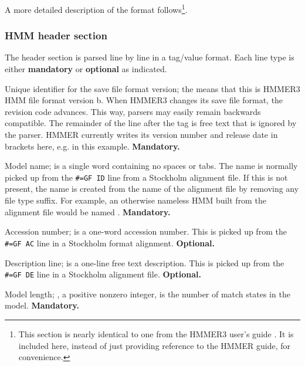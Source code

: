 A more detailed description of the format follows\footnote{This section is
  nearly identical to one from the HMMER3 user's guide
  \cite{hmmer3guide}. It is included here, instead of just providing
  reference to the HMMER guide, for convenience.}.

\subsubsection{HMM header section}

The header section is parsed line by line in a tag/value format. Each
line type is either \textbf{mandatory} or \textbf{optional} as
indicated. 

\begin{sreitems}{}

\item [\emprog{HMMER3/f}] Unique identifier for the save file format
  version; the  means that this is HMMER3 HMM file format
  version b. When HMMER3 changes its save file format, the revision
  code advances. This way, parsers may easily remain backwards
  compatible. The remainder of the line after the  tag
  is free text that is ignored by the parser. HMMER currently writes
  its version number and release date in brackets here,
  e.g. \prog{[3.0b2 | June 2009]} in this
  example. \textbf{Mandatory.}

\item [\emprog{NAME <s>}] Model name;  is a single word
containing no spaces or tabs. The name is normally picked up from the
\verb+#=GF ID+ line from a Stockholm alignment file.  If this is not
present, the name is created from the name of the alignment file by
removing any file type suffix. For example, an otherwise nameless HMM
built from the alignment file  would be named
.  \textbf{Mandatory.}

\item [\emprog{ACC <s>}] Accession number;  is a one-word
accession number. This is picked up from the \verb+#=GF AC+ line in a
Stockholm format alignment. \textbf{Optional.}

\item [\emprog{DESC <s>}] Description line;  is a one-line
free text description. This is picked up from the \verb+#=GF DE+ line
in a Stockholm alignment file. \textbf{Optional.}

\item [\emprog{LENG <d>}] Model length; , a positive nonzero
integer, is the number of match states in the model.
\textbf{Mandatory.}


\end{sreitems}
